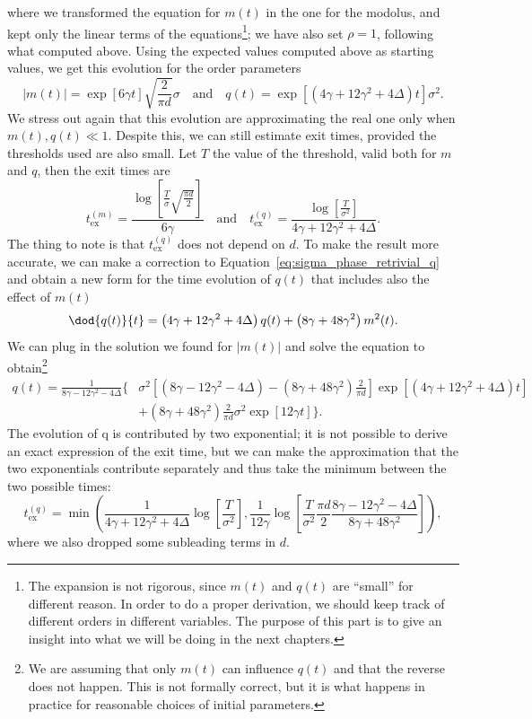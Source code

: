 where we transformed the equation for \(m(t)\) in the one for the modolus,
and kept only the linear terms of the equations\footnote{
  The expansion is not rigorous, since \(m(t)\) and \(q(t)\) are ``small'' for different reason.
  In order to do a proper derivation, we should keep track of different orders in different variables.
  The purpose of this part is to give an insight into what we will be doing in the next chapters.
}; we have also set \(\rho=1\), following what computed above.
Using the expected values computed above as starting values, we get this evolution for the order parameters
\[
  |m(t)| = \exp{\left[6\gamma t\right]}\sqrt{\frac{2}{\pi d}}\sigma \quad\text{and}\quad
  q(t) = \exp{\left[\left(4 \gamma + 12 \gamma^2 + 4\Delta\right)t\right]}\sigma^2.
\]
We stress out again that this evolution are approximating the real one only when \(m(t),q(t)\ll1\).
Despite this, we can still estimate exit times, provided the thresholds used are also small.
Let \(T\) the value of the threshold, valid both for \(m\) and \(q\), then the exit times are
\begin{equation}
  t_\text{ex}^{(m)} = \frac{\log{\left[\frac{T}{\sigma}\sqrt{\frac{\pi d}{2}}\right]}}{6\gamma} \quad\text{and}\quad
  t_\text{ex}^{(q)} = \frac{\log{\left[\frac{T}{\sigma^2}\right]}}{4 \gamma + 12 \gamma^2 + 4\Delta}.
\end{equation}
The thing to note is that \(t_\text{ex}^{(q)}\) does not depend on \(d\).
To make the result more accurate, we can make a correction to Equation~\eqref{eq:sigma_phase_retrivial_q}
and obtain a new form for the time evolution of \(q(t)\) that includes also the effect of \(m(t)\)
\[
  \dod{q{(t)}}{t} = \left(4 \gamma + 12 \gamma^2 + 4\Delta\right) q{(t)} + \left(8\gamma+48\gamma^2\right)m^2{(t)}.
\]
We can plug in the solution we found for \(|m(t)|\) and solve the equation to obtain\footnote{
  We are assuming that only \(m(t)\) can influence \(q(t)\) and that the reverse does not happen.
  This is not formally correct, but it is what happens in practice for reasonable choices of initial parameters.
}
\[\begin{split}
  q{(t)} = \frac{1}{8\gamma-12\gamma^2-4\Delta}\Bigg\{&\sigma^2\left[(8\gamma-12\gamma^2-4\Delta)-\left(8\gamma+48\gamma^2\right)\frac{2}{\pi d}\right]\exp\left[\left(4 \gamma + 12 \gamma^2 + 4\Delta\right)t\right]\\
          &+\left(8\gamma+48\gamma^2\right)\frac{2}{\pi d}\sigma^2 \exp\left[12\gamma t\right]\Bigg\}.
\end{split}\]
The evolution of q is contributed by two exponential;
it is not possible to derive an exact expression of the exit time,
but we can make the approximation that the two exponentials contribute separately
and thus take the minimum between the two possible times:
\[
  t_\text{ex}^{(q)} = \min\left(\frac{1}{4 \gamma + 12 \gamma^2 + 4\Delta}\log{\left[\frac{T}{\sigma^2}\right]},
                                \frac{1}{12\gamma}\log{\left[\frac{T}{\sigma^2}\frac{\pi d}{2}\frac{8\gamma-12\gamma^2-4\Delta}{8\gamma+48\gamma^2}\right]}\right),
\]
where we also dropped some subleading terms in \(d\).

